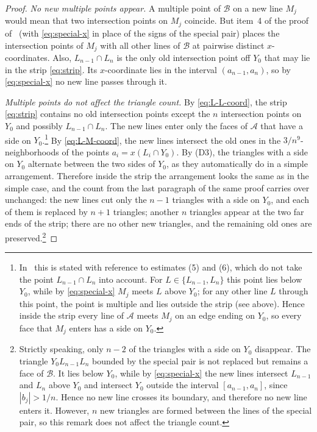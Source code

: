 \begin{proof}
\emph{No new multiple points appear.}
A multiple point of $\mathcal B$ on a new line $M_j$ would mean that two intersection points on $M_j$ coincide.
But item~4 of the proof of~\cite[Prop.~3.1]{bbl} (with \eqref{eq:special-x} in place of the signs of the special pair) places the intersection points of $M_j$ with all other lines of $\mathcal B$ at pairwise distinct $x$-coordinates.
Also, $L_{n-1}\cap L_n$ is the only old intersection point off $Y_0$ that may lie in the strip \eqref{eq:strip}. Its $x$-coordinate lies in the interval $(a_{n-1},a_n)$, so by \eqref{eq:special-x} no new line passes through it.

\emph{Multiple points do not affect the triangle count.}
By \eqref{eq:L-L-coord}, the strip \eqref{eq:strip} contains no old intersection points except the $n$ intersection points on $Y_0$ and possibly $L_{n-1}\cap L_n$.
The new lines enter only the faces of $\mathcal A$ that have a side on $Y_0$.\footnote{In~\cite{bbl} this is stated with reference to estimates (5) and (6), which do not take the point $L_{n-1}\cap L_n$ into account. For $L\in\{L_{n-1},L_n\}$ this point lies below $Y_0$, while by \eqref{eq:special-x} $M_j$ meets $L$ above $Y_0$; for any other line $L$ through this point, the point is multiple and lies outside the strip (see above). Hence inside the strip every line of $\mathcal A$ meets $M_j$ on an edge ending on $Y_0$, so every face that $M_j$ enters has a side on $Y_0$.}
By \eqref{eq:L-M-coord}, the new lines intersect the old ones in the $3/n^{9}$-neighborhoods of the points $a_i=x(L_i\cap Y_0)$.
By (D3), the triangles with a side on $Y_0$ alternate between the two sides of $Y_0$, as they automatically do in a simple arrangement.
Therefore inside the strip the arrangement looks the same as in the simple case, and the count from the last paragraph of the same proof carries over unchanged: the new lines cut only the $n-1$ triangles with a side on $Y_0$, and each of them is replaced by $n+1$ triangles; another $n$ triangles appear at the two far ends of the strip; there are no other new triangles, and the remaining old ones are preserved.\footnote{
Strictly speaking, only $n-2$ of the triangles with a side on $Y_0$ disappear.
The triangle $Y_0L_{n-1}L_n$ bounded by the special pair is not replaced but remains a face of $\mathcal B$. It lies below $Y_0$, while by \eqref{eq:special-x} the new lines intersect $L_{n-1}$ and $L_n$ above $Y_0$ and intersect $Y_0$ outside the interval $[a_{n-1},a_n]$, since $|b_j|>1/n$.
Hence no new line crosses its boundary, and therefore no new line enters it.
However, $n$ new triangles are formed between the lines of the special pair, so this remark does not affect the triangle count.
}
\end{proof}
